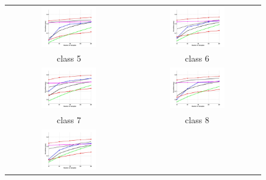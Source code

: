 \begin{figure}[h]
	\centering
	\begin{tabular}{cc}
		\includegraphics[width=0.45\textwidth]{appendix/tables/MNIST_Rate_0_class_5.jpg} & 
		\includegraphics[width=0.45\textwidth]{appendix/tables/MNIST_Rate_0_class_6.jpg} \\
		class 5 & class 6\\
		\includegraphics[width=0.45\textwidth]{appendix/tables/MNIST_Rate_0_class_7.jpg} & 
		\includegraphics[width=0.45\textwidth]{appendix/tables/MNIST_Rate_0_class_8.jpg} \\
		class 7 & class 8\\
		\includegraphics[width=0.45\textwidth]{appendix/tables/MNIST_Rate_0_class_9.jpg} & 

\end{tabular}
\end{figure}
